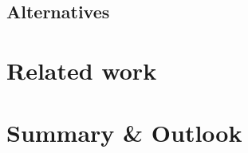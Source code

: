 \documentclass[sigplan,11pt,nonacm]{acmart}
\begin{document}
\subsection{Alternatives}


\section{Related work}
\label{sec:relatedwork}


\section{Summary \& Outlook}
\label{sec:summary}




\end{document}
